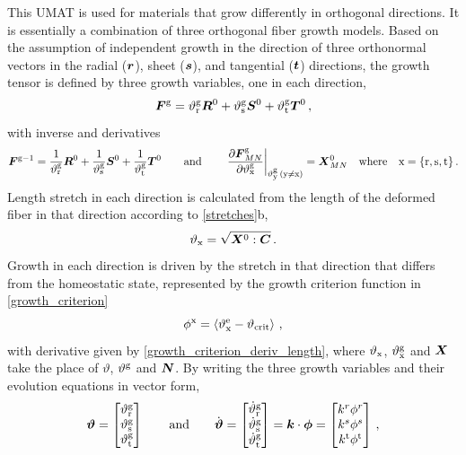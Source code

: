 \documentclass[10pt,letterpaper,oneside]{report}
\newcommand{\sca}[1]{\mbox{\rm{#1}}{}} %
\newcommand{\ten}[1]{\mbox{\boldmath $#1$}{}}
\newcommand{\scas}[1]{\mbox{{\scriptsize{${\rm{#1}}$}}}{}}
\begin{document}
This UMAT is used for materials that grow differently in orthogonal directions.  It is essentially a combination of three orthogonal fiber growth models.  Based on the assumption of independent growth in the direction of three orthonormal vectors in the radial ($\ten{r}$), sheet ($\ten{s}$), and tangential ($\ten{t}$) directions, the growth tensor is defined by three growth variables, one in each direction,
\begin{equation}
\ten{F}^{\scas{g}} = \vartheta^{\scas{g}}_{\scas{r}}  \ten{R}^0 + \vartheta^{\scas{g}}_{\scas{s}} \ten{S}^0 + \vartheta^{\scas{g}}_{\scas{t}} \ten{T}^0 \, , 
\end{equation}
with inverse and derivatives 
\begin{equation}
\ten{F}^{\scas{g}-1} = \frac{1}{\vartheta^{\scas{g}}_{\scas{r}}}  \ten{R}^0 + \frac{1}{\vartheta^{\scas{g}}_{\scas{s}}} \ten{S}^0 + \frac{1}{\vartheta^{\scas{g}}_{\scas{t}}} \ten{T}^0 
\qquad \text{and} \qquad
\left. \frac{\partial \ten{F}^{\scas{g}}_{MN} }{\partial \vartheta^{\scas{g}}_{\scas{x}} } \right|_{\vartheta^{\scas{g}}_{\scas{y}} \, (\scas{y} \neq \scas{x})} = \ten{X}^0_{MN} 
\quad \text{where} \quad
\sca{x} = \lbrace \sca{r}, \sca{s}, \sca{t} \rbrace \, .
\end{equation}
Length stretch in each direction is calculated from the length of the deformed fiber in that direction according to \autoref{stretches}b, 
\begin{equation*}
\vartheta_{\scas{x}} = \sqrt{ \ten{X}^0 : \ten{C} } \, .
\end{equation*}
Growth in each direction is driven by the stretch in that direction that differs from the homeostatic state, represented by the growth criterion function in \autoref{growth_criterion}
\begin{equation*}
\phi^{\scas{x}} = \left\langle \vartheta^{\scas{e}}_{\scas{x}} - \vartheta_{\scas{crit}} \right\rangle \, ,
\end{equation*}
with derivative given by \autoref{growth_criterion_deriv_length}, where $\vartheta_{\scas{x}}$, $\vartheta^{\scas{g}}_{\scas{x}}$ and $\ten{X}$ take the place of $\vartheta$, $\vartheta^{\scas{g}}$ and $\ten{N}$.
By writing the three growth variables and their evolution equations in vector form, 
\begin{equation}
\ten{\vartheta} = \begin{bmatrix} \vartheta^{\scas{g}}_{\scas{r}} \\ \vartheta^{\scas{g}}_{\scas{s}} \\ \vartheta^{\scas{g}}_{\scas{t}} \end{bmatrix} 
\qquad \text{and} \qquad
\dot{\ten{\vartheta} } = \begin{bmatrix} \dot{\vartheta}^{\scas{g}}_{\scas{r}} \\ \dot{\vartheta}^{\scas{g}}_{\scas{s}} \\ \dot{\vartheta}^{\scas{g}}_{\scas{t}} \end{bmatrix}  = \ten{k} \cdot \ten{\phi} = \begin{bmatrix} k^{r} \phi^{r} \\ k^{s} \phi^{s} \\ k^{\scas{t}} \phi^{\scas{t}} \end{bmatrix} \, ,
\end{equation}
\end{document}
